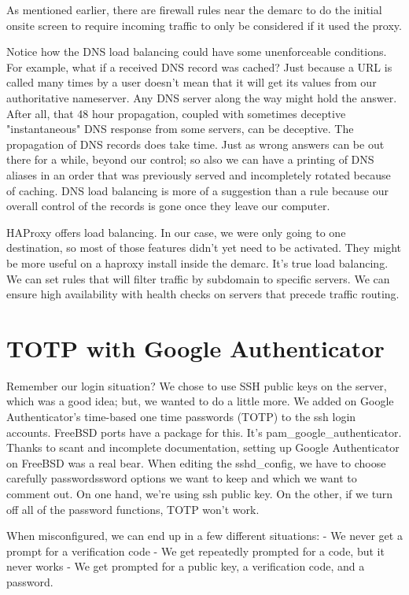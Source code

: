 As mentioned earlier, there are \gls{firewall} rules near the demarc to do the initial onsite screen to require incoming traffic to only be considered if it used the proxy.  

Notice how the DNS load balancing could have some unenforceable conditions.  For example, what if a received DNS record was cached?  Just because a URL is called many times by a user doesn't mean that it will get its values from our authoritative nameserver.  Any DNS server along the way might hold the answer.  After all, that 48 hour propagation, coupled with sometimes deceptive "instantaneous" DNS response from some servers, can be deceptive.  The propagation of DNS records does take time.  Just as wrong answers can be out there for a while, beyond our control; so also we can have a printing of DNS aliases in an order that was previously served and incompletely rotated because of caching.  DNS load balancing is more of a suggestion than a rule because our overall control of the records is gone once they leave our computer.

HAProxy offers load balancing.  In our case, we were only going to one destination, so most of those features didn't yet need to be activated.  They might be more useful on a haproxy install inside the demarc.  It's true load balancing.  We can set rules that will filter traffic by subdomain to specific servers.  We can ensure high availability with health checks on servers that precede traffic routing.  

\section{TOTP with Google Authenticator}


Remember our login situation?  We chose to use SSH public keys on the server, which was a good idea; but, we wanted to do a little more.  We added on Google Authenticator's time-based one time passwords (TOTP) to the ssh login accounts.  
FreeBSD ports have a package for this.  It's pam\_google\_authenticator.  Thanks to scant and incomplete documentation, setting up Google Authenticator on FreeBSD was a real bear.  When editing the sshd\_config, we have to choose carefully \gls{password}ssword options we want to keep and which we want to comment out.  On one hand, we're using ssh public key.  On the other, if we turn off all of the password functions, TOTP won't work.  

When misconfigured, we can end up in a few different situations:
 - We never get a prompt for a verification code
 - We get repeatedly prompted for a code, but it never works
 - We get prompted for a public key, a verification code, and a \gls{password}.

